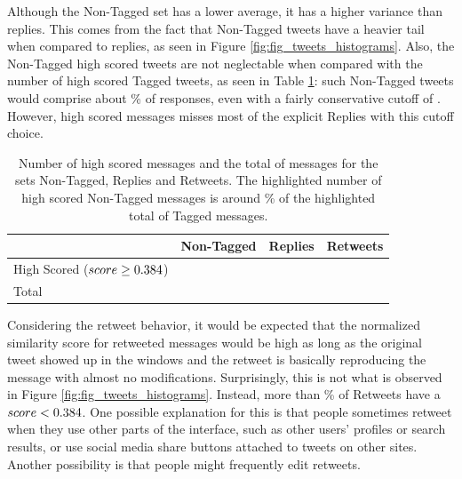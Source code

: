 Although the Non-Tagged set has a lower average, it has a higher variance than replies. This comes from the fact that Non-Tagged tweets have a heavier tail when compared to replies, as seen in Figure \ref{fig:fig_tweets_histograms}. Also, the Non-Tagged high scored tweets are not neglectable when compared with the number of high scored Tagged tweets, as seen in Table \ref{tab:highScoredCounts}: such Non-Tagged tweets would comprise about \highNonTaggedTweetCountPct{}\% of responses, even with a fairly conservative cutoff of \thresholdScore{}. However, high scored messages misses most of the explicit Replies with this cutoff choice.

\begin{table}[!tb]
	\centering
	\fontsize{9pt}{11pt}\selectfont
		\begin{tabular}{l|>{\centering\arraybackslash}m{1.6cm}|>{\centering\arraybackslash}m{1cm}|>{\centering\arraybackslash}m{1.1cm}|}
			\cline{2-4}
			& Non-Tagged & Replies & Retweets \\ \hline
			\multicolumn{1}{|p{2.2cm}|}{\parbox[top][22pt][c]{2.2cm}{High Scored\\($score \geq 0.384{}$)}} & 
			\cellcolor{gray!25} \highNonTaggedTweetCount{} & \highRepliesTweetCount{} & \highRetweetsTweetCount{} \\ \hline
			\multicolumn{1}{|p{2.2cm}|}{Total} & 
			\totalNonTaggedTweetCount{} & \cellcolor{gray!25} \totalReplies{} & \cellcolor{gray!25} \totalRetweets{} \\ \hline
		\end{tabular}
		\caption{Number of high scored messages and the total of messages for the sets Non-Tagged, Replies and Retweets. The highlighted number of high scored Non-Tagged messages is around \highNonTaggedTweetCountPct{}\% of the highlighted total of Tagged messages.}
	\label{tab:highScoredCounts}
\end{table}

Considering the retweet behavior, it would be expected that the normalized similarity score for retweeted messages would be high as long as the original tweet showed up in the windows and the retweet is basically reproducing the message with almost no modifications. 
Surprisingly, this is not what is observed in Figure \ref{fig:fig_tweets_histograms}.  Instead, more than \lowRetweetCountPct{}\% of Retweets have a $score < 0.384{}$.  One possible explanation for this is that people sometimes retweet when they use other parts of the interface, such as other users' profiles or search results, or use social media share buttons attached to tweets on other sites.  Another possibility is that people might frequently edit retweets.

